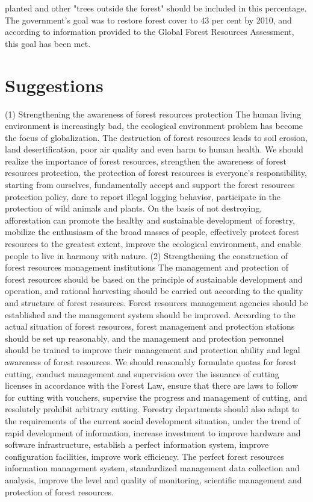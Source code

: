 \documentclass{book}\usepackage{knitr}
\begin{document}
{planted and other "trees outside the forest" should be included in this percentage. The government's goal was to restore forest cover to 43 per cent by 2010, and according to information provided to the Global Forest Resources Assessment, this goal has been met.

\section{Suggestions}
(1) Strengthening the awareness of forest resources protection
The human living environment is increasingly bad, the ecological environment problem has become the focus of globalization. The destruction of forest resources leads to soil erosion, land desertification, poor air quality and even harm to human health. We should realize the importance of forest resources, strengthen the awareness of forest resources protection, the protection of forest resources is everyone's responsibility, starting from ourselves, fundamentally accept and support the forest resources protection policy, dare to report illegal logging behavior, participate in the protection of wild animals and plants. On the basis of not destroying, afforestation can promote the healthy and sustainable development of forestry, mobilize the enthusiasm of the broad masses of people, effectively protect forest resources to the greatest extent, improve the ecological environment, and enable people to live in harmony with nature.
(2) Strengthening the construction of forest resources management institutions
The management and protection of forest resources should be based on the principle of sustainable development and operation, and rational harvesting should be carried out according to the quality and structure of forest resources. Forest resources management agencies should be established and the management system should be improved. According to the actual situation of forest resources, forest management and protection stations should be set up reasonably, and the management and protection personnel should be trained to improve their management and protection ability and legal awareness of forest resources. We should reasonably formulate quotas for forest cutting, conduct management and supervision over the issuance of cutting licenses in accordance with the Forest Law, ensure that there are laws to follow for cutting with vouchers, supervise the progress and management of cutting, and resolutely prohibit arbitrary cutting. Forestry departments should also adapt to the requirements of the current social development situation, under the trend of rapid development of information, increase investment to improve hardware and software infrastructure, establish a perfect information system, improve configuration facilities, improve work efficiency. The perfect forest resources information management system, standardized management data collection and analysis, improve the level and quality of monitoring, scientific management and protection of forest resources.
}
\end{document}
